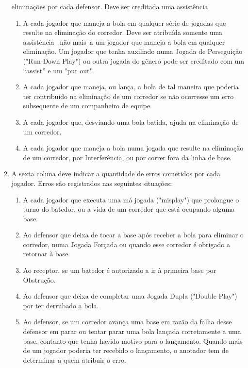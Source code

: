 \begin{multicols}{2}
\begin{enumerate}[label= \arabic*)]
		eliminações por cada defensor. Deve ser creditada uma assistência 
		\begin{enumerate}[label= (\alph*)]
			\item A cada jogador que maneja a bola em qualquer série de jogadas que resulte na 		eliminação do corredor. Deve ser atribuída somente uma assistência –não mais–a um 		jogador que maneja a bola em qualquer eliminação. Um jogador que tenha auxiliado 		numa Jogada de Perseguição ("Run-Down Play") ou outra jogada do gênero pode ser 		creditado com um “assist” e um "put out". 
			\item A cada jogador que maneja, ou lança, a bola de tal maneira que poderia ter 		contribuído na eliminação de um corredor se não ocorresse um erro subsequente de 		um companheiro de equipe. 			
			\item A cada jogador que, desviando uma bola batida, ajuda na eliminação de um 
			corredor. 
			\item A cada jogador que maneja a bola numa jogada que resulte na eliminação de um 
			corredor, por Interferência, ou por correr fora da linha de base. 
		\end{enumerate}
		
		\item A sexta coluna deve indicar a quantidade de erros cometidos por cada jogador. Erros 
		são registrados nas seguintes situações: 
		\begin{enumerate}[label= (\alph*)]
			\item A cada jogador que executa uma má jogada ("misplay") que prolongue o turno do 
			batedor, ou a vida de um corredor que está ocupando alguma base. 
			\item Ao defensor que deixa de tocar a base após receber a bola para eliminar o 
			corredor, numa Jogada Forçada ou quando esse corredor é obrigado a retornar à base. 
			\item Ao receptor, se um batedor é autorizado a ir à primeira base por Obstrução. 
			\item Ao defensor que deixa de completar uma Jogada Dupla ("Double Play") por ter 
			derrubado a bola. 
			\item Ao defensor, se um corredor avança uma base em razão da falha desse defensor 
			em parar ou tentar parar uma bola lançada corretamente a uma base, contanto que tenha havido motivo para o lançamento. Quando mais de um jogador poderia ter 
			recebido o lançamento, o anotador tem de determinar a quem atribuir o erro. 
		\end{enumerate}
	\end{enumerate}
\end{multicols}

